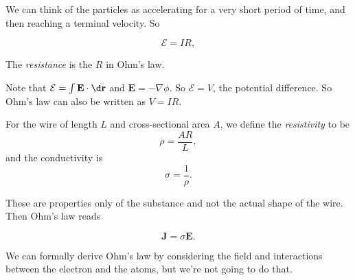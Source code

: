 \documentclass[a4paper]{article}
\begin{document}
We can think of the particles as accelerating for a very short period of time, and then reaching a terminal velocity. So
\begin{law}
  \[
    \mathcal{E} = IR,
  \]
\end{law}
\begin{defi}[Resistance]
  The \emph{resistance} is the $R$ in Ohm's law.
\end{defi}
Note that $\mathcal{E} = \int \mathbf{E}\cdot \d \mathbf{r}$ and $\mathbf{E} = - \nabla\phi$. So $\mathcal{E} = V$, the potential difference. So Ohm's law can also be written as $V = IR$.

\begin{defi}
For the wire of length $L$ and cross-sectional area $A$, we define the \emph{resistivity} to be
\[
  \rho = \frac{AR}{L},
\]
and the conductivity is
\[
  \sigma = \frac{1}{\rho}.
\]
\end{defi}
These are properties only of the substance and not the actual shape of the wire. Then Ohm's law reads
\begin{law}
  \[
    \mathbf{J} = \sigma \mathbf{E}.
  \]
\end{law}
We can formally derive Ohm's law by considering the field and interactions between the electron and the atoms, but we're not going to do that.
\end{document}
